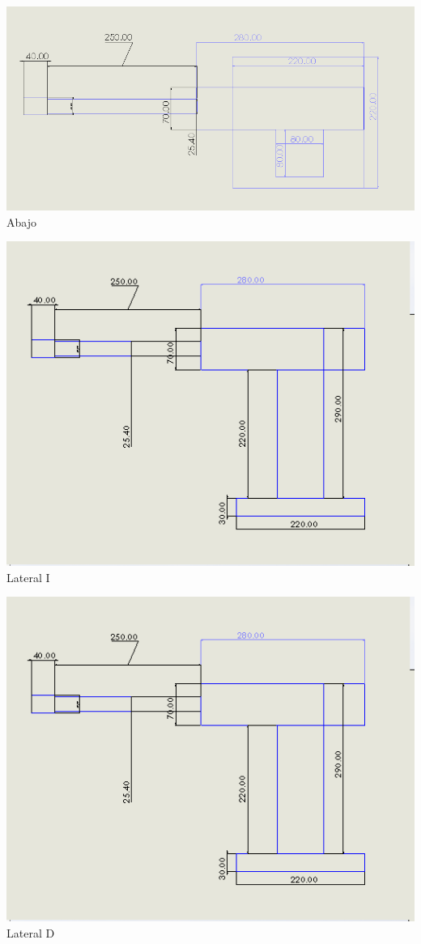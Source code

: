 \documentclass[12pt,a4paper]{report}
\begin{document}
\begin{center}
\includegraphics[scale=.6]{DibujoCAD3.png}
Abajo
\end{center}


\begin{center}
\includegraphics[scale=.6]{DibujoCAD2.png}
Lateral I
\end{center}

\begin{center}
\includegraphics[scale=.6]{DibujoCAD2.png}
Lateral D
\end{center}
\end{document}

